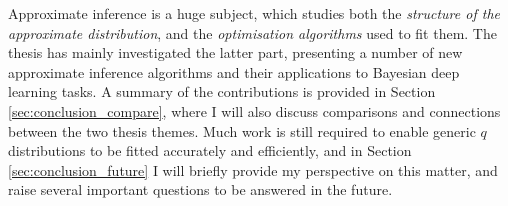 
Approximate inference is a huge subject, which studies both the \emph{structure of the approximate distribution}, and the \emph{optimisation algorithms} used to fit them. The thesis has mainly investigated the latter part, presenting a number of new approximate inference algorithms and their applications to Bayesian deep learning tasks. A summary of the contributions is provided in Section \ref{sec:conclusion_compare}, where I will also discuss comparisons and connections between the two thesis themes. Much work is still required to enable generic $q$ distributions to be fitted accurately and efficiently, and in Section \ref{sec:conclusion_future} I will briefly provide my perspective on this matter, and raise several important questions to be answered in the future.